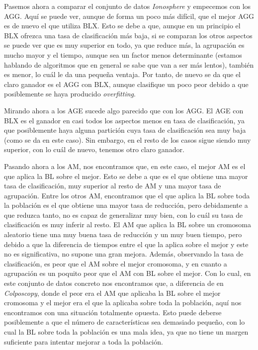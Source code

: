\documentclass[11pt,a4paper]{article}
\begin{document}
Pasemos ahora a comparar el conjunto de datos \textit{Ionosphere} y empecemos con los AGG. Aquí se puede ver, aunque de forma un
poco más difícil, que el mejor AGG es de nuevo el que utiliza BLX. Esto se debe a que, aunque en un principio el BLX ofrezca una
tasa de clasificación más baja, si se comparan los otros aspectos se puede ver que es muy superior en todo, ya que reduce más,
la agrupación es mucho mayor y el tiempo, aunque sea un factor menos determinante (estamos hablando de algoritmos que en general
se sabe que van a ser más lentos), también es menor, lo cuál le da una pequeña ventaja. Por tanto, de nuevo se da que el claro
ganador es el AGG con BLX, aunque clasifique un poco peor debido a que posiblemente se haya producido \textit{overfitting}.

Mirando ahora a los AGE sucede algo parecido que con los AGG. El AGE con BLX es el ganador en casi todos los aspectos menos en
tasa de clasificación, ya que posiblemente haya alguna partición cuya tasa de clasificación sea muy baja (como se da en este
caso). Sin embargo, en el resto de los casos sigue siendo muy superior, con lo cuál de nuevo, tenemos otro claro ganador.

Pasando ahora a los AM, nos encontramos que, en este caso, el mejor AM es el que aplica la BL sobre el mejor. Esto se debe a que
es el que obtiene una mayor tasa de clasificación, muy superior al resto de AM y una mayor tasa de agrupación. Entre los otros
AM, encontramos que el que aplica la BL sobre toda la población es el que obtiene una mayor tasa de reducción, pero debidamente
a que reduzca tanto, no es capaz de generalizar muy bien, con lo cuál su tasa de clasificación es muy inferir al resto. El AM
que aplica la BL sobre un cromosoma aleatorio tiene una muy buena tasa de reducción y un muy buen tiempo, pero debido a que
la diferencia de tiempos entre el que la aplica sobre el mejor y este no es significativa, no supone una gran mejora. Además,
observando la tasa de clasificación, es peor que el AM sobre el mejor cromosoma, y en cuanto a agrupación es un poquito peor
que el AM con BL sobre el mejor. Con lo cual, en este conjunto de datos concreto nos encontramos que, a diferencia de en
\textit{Colposcopy}, donde el peor era el AM que aplicaba la BL sobre el mejor cromosoma y el mejor era el que la aplicaba sobre
toda la población, aquí nos encontramos con una situación totalmente opuesta. Esto puede deberse posiblemente a que el número de
características sea demasiado pequeño, con lo cual la BL sobre toda la población es una mala idea, ya que no tiene un margen
suficiente para intentar mejorar a toda la población.
\end{document}
